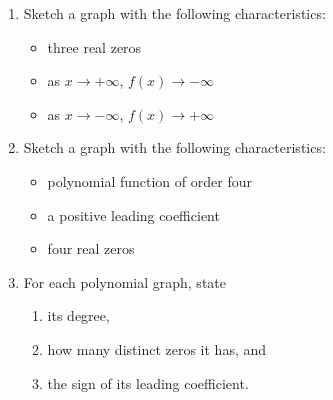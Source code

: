 \documentclass[12pt, oneside]{article}
\begin{document}
\begin{enumerate}
\newpage

\item Sketch a graph with the following characteristics: 
\begin{itemize}
\item three real zeros
\item as $x \rightarrow + \infty$, $f(x) \rightarrow - \infty$
\item as $x \rightarrow - \infty$, $f(x) \rightarrow + \infty$
\end{itemize}
\begin{center}
\end{center} %


\item Sketch a graph with the following characteristics: 
\begin{itemize}
\item polynomial function of order four
\item a positive leading coefficient
\item four real zeros
\end{itemize}
\begin{center}
\end{center}

\newpage

\item For each polynomial graph, state 
\begin{enumerate}
\item its degree,
\item how many distinct zeros it has, and
\item the sign of its leading coefficient.
\end{enumerate}


\end{enumerate}
\end{document}
